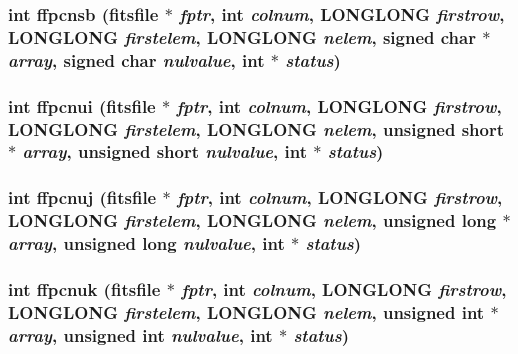 \subsubsection{\setlength{\rightskip}{0pt plus 5cm}int ffpcnsb (\bf{fitsfile} $\ast$ {\em fptr}, int {\em colnum}, \bf{LONGLONG} {\em firstrow}, \bf{LONGLONG} {\em firstelem}, \bf{LONGLONG} {\em nelem}, signed char $\ast$ {\em array}, signed char {\em nulvalue}, int $\ast$ {\em status})}\label{test_2roimasker_2fitsio_8h_a9318e38faa87bac57112d69f6c1a58b}


\subsubsection{\setlength{\rightskip}{0pt plus 5cm}int ffpcnui (\bf{fitsfile} $\ast$ {\em fptr}, int {\em colnum}, \bf{LONGLONG} {\em firstrow}, \bf{LONGLONG} {\em firstelem}, \bf{LONGLONG} {\em nelem}, unsigned short $\ast$ {\em array}, unsigned short {\em nulvalue}, int $\ast$ {\em status})}\label{test_2roimasker_2fitsio_8h_8541e4ca79b0f019d82cd4c74944991d}


\subsubsection{\setlength{\rightskip}{0pt plus 5cm}int ffpcnuj (\bf{fitsfile} $\ast$ {\em fptr}, int {\em colnum}, \bf{LONGLONG} {\em firstrow}, \bf{LONGLONG} {\em firstelem}, \bf{LONGLONG} {\em nelem}, unsigned long $\ast$ {\em array}, unsigned long {\em nulvalue}, int $\ast$ {\em status})}\label{test_2roimasker_2fitsio_8h_4087fc2b72c74e0de0d5ed78f4f3170d}


\subsubsection{\setlength{\rightskip}{0pt plus 5cm}int ffpcnuk (\bf{fitsfile} $\ast$ {\em fptr}, int {\em colnum}, \bf{LONGLONG} {\em firstrow}, \bf{LONGLONG} {\em firstelem}, \bf{LONGLONG} {\em nelem}, unsigned int $\ast$ {\em array}, unsigned int {\em nulvalue}, int $\ast$ {\em status})}\label{test_2roimasker_2fitsio_8h_8369b2614c8c0b06dc09af47f1ce354d}


